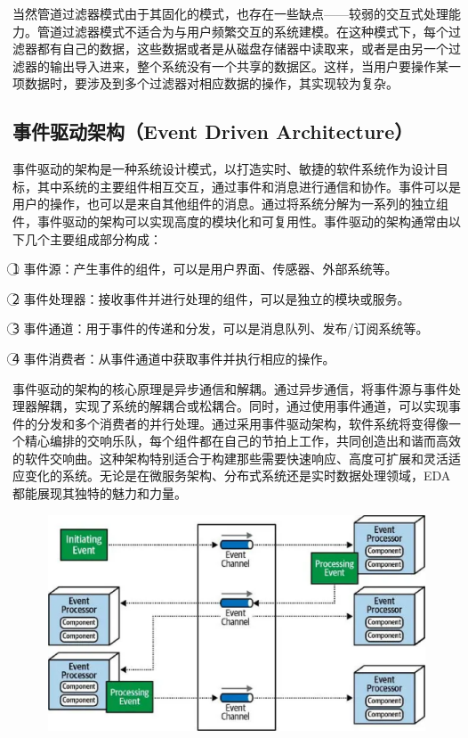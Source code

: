 \documentclass{SCIS2023cn}
\begin{document}
当然管道过滤器模式由于其固化的模式，也存在一些缺点——较弱的交互式处理能力。管道过滤器模式不适合为与用户频繁交互的系统建模。在这种模式下，每个过滤器都有自己的数据，这些数据或者是从磁盘存储器中读取来，或者是由另一个过滤器的输出导入进来，整个系统没有一个共享的数据区。这样，当用户要操作某一项数据时，要涉及到多个过滤器对相应数据的操作，其实现较为复杂。

\subsection{事件驱动架构（Event Driven Architecture）}

事件驱动的架构是一种系统设计模式，以打造实时、敏捷的软件系统作为设计目标，其中系统的主要组件相互交互，通过事件和消息进行通信和协作。事件可以是用户的操作，也可以是来自其他组件的消息。通过将系统分解为一系列的独立组件，事件驱动的架构可以实现高度的模块化和可复用性。事件驱动的架构通常由以下几个主要组成部分构成：

\textcircled{1} 事件源：产生事件的组件，可以是用户界面、传感器、外部系统等。

\textcircled{2} 事件处理器：接收事件并进行处理的组件，可以是独立的模块或服务。

\textcircled{3} 事件通道：用于事件的传递和分发，可以是消息队列、发布/订阅系统等。

\textcircled{4} 事件消费者：从事件通道中获取事件并执行相应的操作。

事件驱动的架构的核心原理是异步通信和解耦。通过异步通信，将事件源与事件处理器解耦，实现了系统的解耦合或松耦合。同时，通过使用事件通道，可以实现事件的分发和多个消费者的并行处理。通过采用事件驱动架构，软件系统将变得像一个精心编排的交响乐队，每个组件都在自己的节拍上工作，共同创造出和谐而高效的软件交响曲。这种架构特别适合于构建那些需要快速响应、高度可扩展和灵活适应变化的系统。无论是在微服务架构、分布式系统还是实时数据处理领域，EDA都能展现其独特的魅力和力量。

\begin{figure}[H]
	\centering
	\includegraphics[width=6.2in]{figs/EDA.eps}
	\label{fig_1}
\end{figure}
\end{document}

